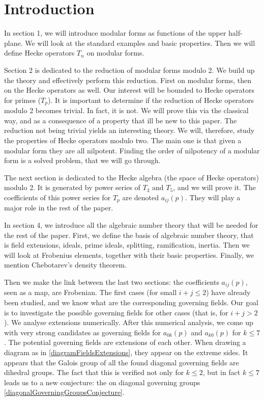 \setcounter{section}{-1}
\section{Introduction}


In section 1, we will introduce modular forms as functions of the upper half-plane.
We will look at the standard examples and basic properties.
Then we will define Hecke operators $T_n$ on modular forms.

Section 2 is dedicated to the reduction of modular forms modulo 2.
We build up the theory and effectively perform this reduction.
First on modular forms, then on the Hecke operators as well.
Our interest will be bounded to Hecke operators for primes ($T_p$).
It is important to determine if the reduction of Hecke operators modulo 2 becomes trivial.
In fact, it is not.
We will prove this via the classical way, and as a consequence of a property that ill be new to this paper.
The reduction not being trivial yields an interesting theory.
We will, therefore, study the properties of Hecke operators modulo two.
The main one is that given a modular form they are all nilpotent.
Finding the order of nilpotency of a modular form is a solved problem, that we will go through.

The next section is dedicated to the Hecke algebra (the space of Hecke operators) modulo 2.
It is generated by power series of $T_3$ and $T_5$, and we will prove it.
The coefficients of this power series for $T_p$ are denoted $a_{ij}(p)$.
They will play a major role in the rest of the paper.

In section 4, we introduce all the algebraic number theory that will be needed for the rest of the paper.
First, we define the basis of algebraic number theory, that is field extensions, ideals, prime ideals, splitting, ramification, inertia.
Then we will look at Frobenius elements, together with their basic properties.
Finally, we mention Chebotarev's density theorem.

Then we make the link between the last two sections: the coefficients $a_{ij}(p)$, seen as a map, are Frobenian.
The first cases (for small $i+j \leq 2$) have already been studied, and we know what are the corresponding governing fields.
Our goal is to investigate the possible governing fields for other cases (that is, for $i+j>2$).
We analyse extensions numerically.
After this numerical analysis, we come up with very strong candidates as governing fields for $a_{0k}(p)$ and $a_{k0}(p)$ for $k \leq 7$.
The potential governing fields are extensions of each other.
When drawing a diagram as in \ref{diagramFieldsExtensions}, they appear on the extreme sides.
It appears that the Galois group of all the found diagonal governing fields are dihedral groups.
The fact that this is verified not only for $k \leq 2$, but in fact $k \leq 7$ leads us to a new conjecture: the on diagonal governing groups \ref{diagonalGoverningGroupsConjecture}.

